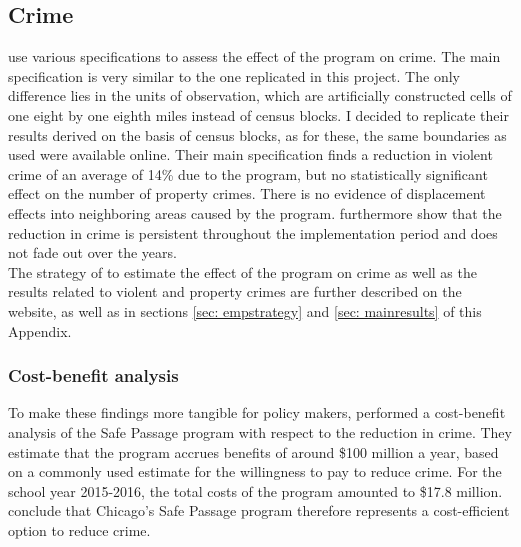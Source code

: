 \documentclass[]{article}
\begin{document}
\subsection{Crime}
\cite{mcmillen2017} use various specifications to assess the effect of the program on crime. The main specification is very similar to the one replicated in this project. The only difference lies in the units of observation, which are artificially constructed cells of one eight by one eighth miles instead of census blocks. I decided to replicate their results derived on the basis of census blocks, as for these, the same boundaries as \cite{mcmillen2017} used were available online. Their main specification finds a reduction in violent crime of an average of 14\% due to the program, but no statistically significant effect on the number of property crimes. There is no evidence of displacement effects into neighboring areas caused by the program. \cite{mcmillen2017} furthermore show that the reduction in crime is persistent throughout the implementation period and does not fade out over the years. \\

The  strategy of \cite{mcmillen2017} to estimate the effect of the program on crime as well as the results related to violent and property crimes are further described on the website, as well as in sections \ref{sec: empstrategy} and \ref{sec: mainresults} of this Appendix.

\subsubsection{Cost-benefit analysis}
To make these findings more tangible for policy makers, \cite{mcmillen2017} performed a cost-benefit analysis of the Safe Passage program with respect to the reduction in crime. They estimate that the program accrues benefits of around \$100 million a year, based on a commonly used estimate for the willingness to pay to reduce crime. For the school year 2015-2016, the total costs of the program amounted to  \$17.8 million.  \cite{mcmillen2017} conclude that Chicago's Safe Passage program therefore represents a cost-efficient option to reduce crime.
\end{document}
